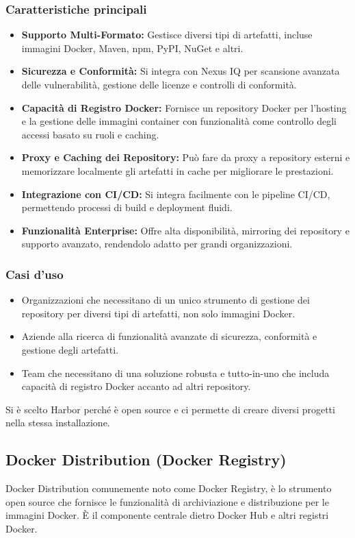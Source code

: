 \documentclass[12pt]{report}
\begin{document}
\subsubsection{Caratteristiche principali}
\begin{itemize}
  \item \textbf{Supporto Multi-Formato:} Gestisce diversi tipi di artefatti, incluse immagini Docker, Maven, npm, PyPI, NuGet e altri.
  \item \textbf{Sicurezza e Conformità:} Si integra con Nexus IQ per scansione avanzata delle vulnerabilità, gestione delle licenze e controlli di conformità.
  \item \textbf{Capacità di Registro Docker:} Fornisce un repository Docker per l'hosting e la gestione delle immagini container con funzionalità come controllo degli accessi basato su ruoli e caching.
  \item \textbf{Proxy e Caching dei Repository:} Può fare da proxy a repository esterni e memorizzare localmente gli artefatti in cache per migliorare le prestazioni.
  \item \textbf{Integrazione con CI/CD:} Si integra facilmente con le pipeline CI/CD, permettendo processi di build e deployment fluidi.
  \item \textbf{Funzionalità Enterprise:} Offre alta disponibilità, mirroring dei repository e supporto avanzato, rendendolo adatto per grandi organizzazioni.\cite{nexus}
\end{itemize}
\subsubsection{Casi d'uso}
\begin{itemize}
  \item Organizzazioni che necessitano di un unico strumento di gestione dei repository per diversi tipi di artefatti, non solo immagini Docker.
  \item Aziende alla ricerca di funzionalità avanzate di sicurezza, conformità e gestione degli artefatti.
  \item Team che necessitano di una soluzione robusta e tutto-in-uno che includa capacità di registro Docker accanto ad altri repository.
\end{itemize}

Si è scelto Harbor perché è open source e ci permette di creare diversi progetti nella stessa installazione.

\subsection{Docker Distribution (Docker Registry)}
Docker Distribution comunemente noto come Docker Registry, è lo strumento open source che fornisce le funzionalità di archiviazione e distribuzione per le immagini Docker. È il componente centrale dietro Docker Hub e altri registri Docker. \cite{distribution}
\end{document}
